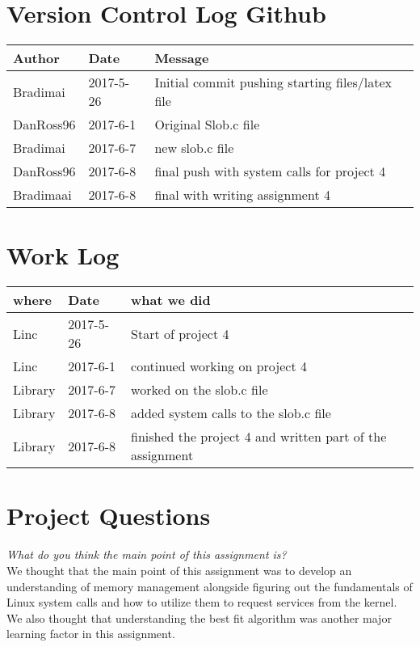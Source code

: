\documentclass[letterpaper,10pt,titlepage]{article}
\begin{document}
\section{Version Control Log Github}
\begin{tabular}{lll} \textbf{Author}
     & \textbf{Date}
     & \textbf{Message}
\\ \hline
Bradimai & 2017-5-26 & Initial commit pushing starting files/latex file \\ \hline
DanRoss96 & 2017-6-1 & Original Slob.c file \\ \hline
Bradimai & 2017-6-7 & new slob.c file \\ \hline
DanRoss96 & 2017-6-8 & final push with system calls for project 4 \\ \hline
Bradimaai & 2017-6-8 & final with writing assignment 4 \\ \hline


\end{tabular}

\section{Work Log}
\begin{tabular}{lll} \textbf{where}
     & \textbf{Date}
     & \textbf{what we did}

\\ \hline
Linc & 2017-5-26 & Start of project 4 \\ \hline
Linc & 2017-6-1 & continued working on project 4 \\ \hline
Library & 2017-6-7 & worked on the slob.c file \\ \hline
Library & 2017-6-8 & added system calls to the slob.c file \\ \hline
Library & 2017-6-8 & finished the project 4 and written part of the assignment \\ \hline


\end{tabular}

\section{Project Questions}

\textit{What do you think the main point of this assignment is?}\\

We thought that the main point of this assignment was to develop an understanding of memory management alongside figuring out the fundamentals of Linux system calls and how to utilize them to request services from the kernel. We also thought that understanding the best fit algorithm was another major learning factor in this assignment.\\
\end{document}
